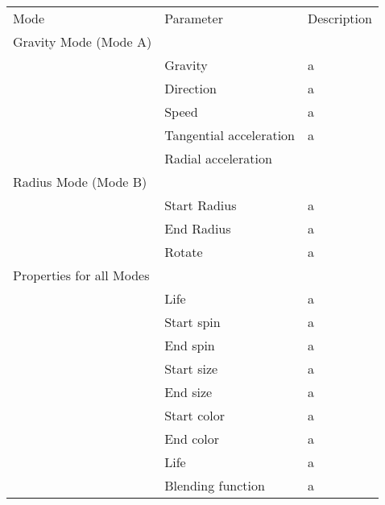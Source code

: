 \documentclass{scrreprt}
\begin{document}
\begin{table}
    \begin{tabular}{lll}
    Mode                     & Parameter               & Description \\
    Gravity Mode (Mode A)    & ~                       & ~           \\ \hline
    ~                        & Gravity                 & a           \\
    ~                        & Direction               & a           \\
    ~                        & Speed                   & a           \\
    ~                        & Tangential acceleration & a           \\
    ~                        & Radial acceleration     & ~           \\
    Radius Mode (Mode B)     & ~                       & ~           \\
    ~                        & Start Radius            & a           \\
    ~                        & End Radius              & a           \\
    ~                        & Rotate                  & a           \\
    Properties for all Modes & ~                       & ~           \\
    ~                        & Life                    & a           \\
    ~                        & Start spin              & a           \\
    ~                        & End spin                & a           \\
    ~                        & Start size              & a           \\
    ~                        & End size                & a           \\
    ~                        & Start color             & a           \\
    ~                        & End color               & a           \\
    ~                        & Life                    & a           \\
    ~                        & Blending function       & a           \\
    \end{tabular}
\end{table}
\end{document}
